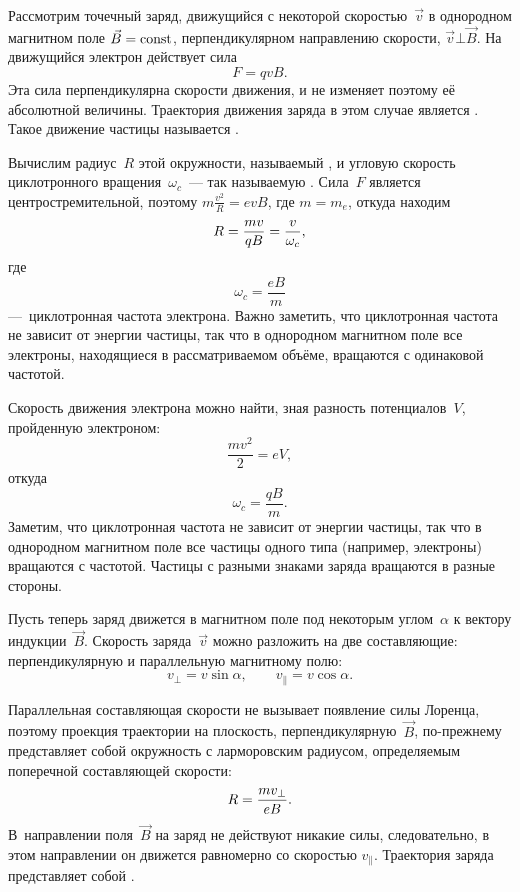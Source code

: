 Рассмотрим точечный заряд, движущийся с некоторой скоростью~$\vec{v}$
в однородном магнитном поле $\vec{B}=\mathrm{const}$, перпендикулярном направлению скорости,
$\vec{v}\bot \vec{B}$. На движущийся электрон действует сила
\begin{equation*}
	F=qvB.
\end{equation*}
Эта сила перпендикулярна скорости движения, и не изменяет поэтому
её абсолютной величины. Траектория движения заряда в этом случае является
. Такое движение частицы называется .

Вычислим радиус~$R$ этой окружности, называемый
, и угловую скорость циклотронного
вращения~$\omega_c$~--- так называемую .
Сила~$F$ является центростремительной, поэтому
$m\frac{v^2}{R}=evB$, где $m=m_e$, откуда находим
\begin{equation}
	\eqmark{3.2}
    R =\frac{m v}{qB}= \frac{v}{\omega_c},
\end{equation}
где
\begin{equation*}
	\omega_c=\frac{eB}{m}
\end{equation*}
---~циклотронная частота электрона. Важно заметить, что циклотронная частота не
зависит от энергии частицы, так что в однородном магнитном поле все электроны,
находящиеся в рассматриваемом объёме, вращаются с одинаковой частотой.

Скорость движения электрона можно найти, зная разность потенциалов~$V$,
пройденную электроном:
\begin{equation*}
	\frac{mv^2}{2}=eV,
\end{equation*}
откуда
\begin{equation}
	\omega_c=\frac{qB}{m}.
\end{equation}
Заметим, что циклотронная частота не зависит от энергии частицы,
так что в однородном магнитном поле все частицы одного типа (например,
электроны) вращаются с  частотой.
Частицы с разными знаками заряда вращаются в разные стороны.

Пусть теперь заряд движется в магнитном поле под некоторым углом~$\alpha$ к
вектору индукции~$\vec{B}$. Скорость заряда~$\vec{v}$ можно разложить
на две составляющие: перпендикулярную и параллельную магнитному полю:
\begin{equation*}
	v_{\bot}=v\sin\alpha,\qquad v_{\parallel}=v\cos\alpha.
\end{equation*}

Параллельная составляющая скорости не вызывает появление силы Лоренца, поэтому
проекция траектории на плоскость, перпендикулярную~$\vec{B}$,
по-прежнему представляет собой окружность с ларморовским радиусом,
определяемым поперечной составляющей скорости:
\begin{equation}
	\eqmark{3.4}
	R =\frac{m v_{\bot}}{eB}.
\end{equation}
В~направлении поля~$\vec{B}$ на заряд не действуют никакие силы,
следовательно, в этом направлении он движется равномерно со скоростью
$v_{\parallel}$.
Траектория заряда представляет собой .

